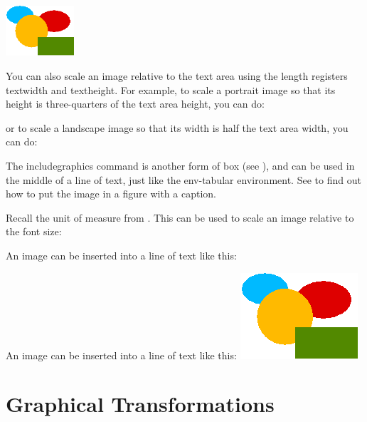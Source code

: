 \begin{resultS}
\includegraphics[width=1in,angle=45]{exercises/shapes}
\end{resultS}

You can also scale an image relative to the text area using the
\gls{length} registers \gls{textwidth} and \gls{textheight}. For
example, to scale a portrait image so that its height is
three-quarters of the text area height, you can do:
\begin{codeS}
\end{codeS}
or to scale a landscape image so that its width is half the text
area width, you can do:
\begin{codeS}
\end{codeS}


The \gls{includegraphics} command is another form of box (see
), and can be used in the middle of a line of
text, just like the \gls{env-tabular} environment. See
 to find out how to put the image in a
figure with a caption.


\label{example:inlinegraphic}%
Recall the  unit of measure from
. This can be used to scale
an image relative to the font size:
\begin{code}
An image can be inserted into a line
of text like this:
\end{code}
\begin{resultS}
An image can be inserted into a line
of text like this:
\includegraphics[height=2ex]{exercises/shapes}
\end{resultS}

\section{Graphical Transformations}
\label{sec:graphtrans}

